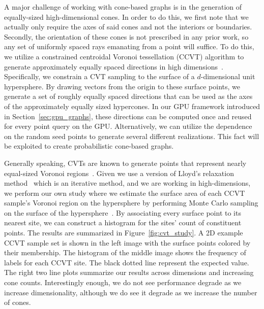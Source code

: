 A major challenge of working with cone-based graphs is in the generation of equally-sized high-dimensional cones.
%
In order to do this, we first note that we actually only require the axes of said cones and not the interiors or boundaries.
%
Secondly, the orientation of these cones is not prescribed in any prior work, so any set of uniformly spaced rays emanating from a point will suffice.
%
To do this, we utilize a constrained centroidal Voronoi tessellation (CCVT) algorithm to generate approximately equally spaced directions in high dimensions~\cite{DuGunzburgerJu2003}.
%
%
Specifically, we constrain a CVT sampling to the surface of a $d$-dimensional unit hypersphere.
%
By drawing vectors from the origin to these surface points, we generate a set of roughly equally spaced directions that can be used as the axes of the approximately equally sized hypercones.
%
In our GPU framework introduced in Section~\ref{sec:gpu_graphs}, these directions can be computed once and reused for every point query on the GPU.
%
Alternatively, we can utilize the dependence on the random seed points to generate several different realizations.
%
This fact will be exploited to create probabilistic cone-based graphs.

Generally speaking, CVTs are known to generate points that represent nearly equal-sized Voronoi
regions~\cite{HesseSlaonWomersley2015, PeyreCohen2004}.
%
Given we use a version of Lloyd's relaxation method~\cite{DuGunzburgerJu2003} which is an iterative method, and we are working in high-dimensions, we perform our own study where we estimate the surface area of each CCVT sample's Voronoi region on the hypersphere by performing Monte Carlo sampling on the surface of the hypersphere~\cite{HarmanLacko2010, HicksWheeling1959}.
%
By associating every surface point to its nearest site, we can construct a histogram for the sites' count of constituent points.
%
The results are summarized in Figure~\ref{fig:cvt_study}.
%
A 2D example CCVT sample set is shown in the left image with the surface points colored by their membership.
%
The histogram of the middle image shows the frequency of labels for each CCVT site.
%
The black dotted line represent the expected value.
%
The right two line plots summarize our results across dimensions and increasing cone counts.
%
Interestingly enough, we do not see performance degrade as we increase dimensionality, although we do see it degrade as we increase the number of cones.

